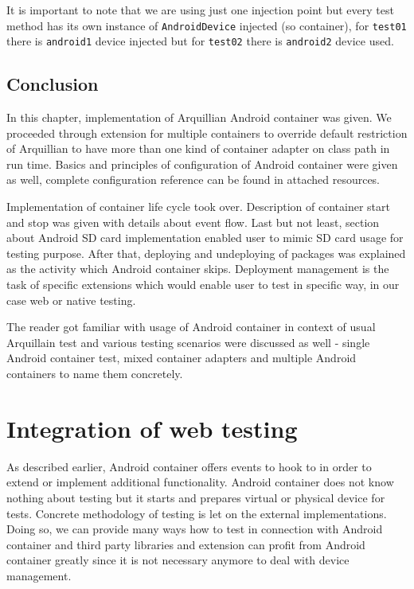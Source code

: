 \documentclass[12pt,final,oneside]{fithesis}
\begin{document}
It is important to note that we are using just one injection point but every test method has its own instance of \texttt{AndroidDevice} injected (so container), for \texttt{test01} there is \texttt{android1} device injected but for \texttt{test02} there is \texttt{android2} device used.

	\section{Conclusion}

In this chapter, implementation of Arquillian Android container was given. We proceeded through extension for multiple containers to override default restriction of Arquillian to have more than one kind of container adapter on class path in run time. Basics and principles of configuration of Android container were given as well, complete configuration reference can be found in attached resources.

Implementation of container life cycle took over. Description of container start and stop was given with details about event flow. Last but not least, section about Android SD card implementation enabled user to mimic SD card usage for testing purpose. After that, deploying and undeploying of packages was explained as the activity which Android container skips. Deployment management is the task of specific extensions which would enable user to test in specific way, in our case web or native testing.

The reader got familiar with usage of Android container in context of usual Arquillain test and various testing scenarios were discussed as well - single Android container test, mixed container adapters and multiple Android containers to name them concretely. 

\chapter{Integration of web testing}

As described earlier, Android container offers events to hook to in order to extend or implement additional functionality. Android container does not know nothing about testing but it starts and prepares virtual or physical device for tests. Concrete methodology of testing is let on the external implementations. Doing so, we can provide many ways how to test in connection with Android container and third party libraries and extension can profit from Android container greatly since it is not necessary anymore to deal with device management.
\end{document}
